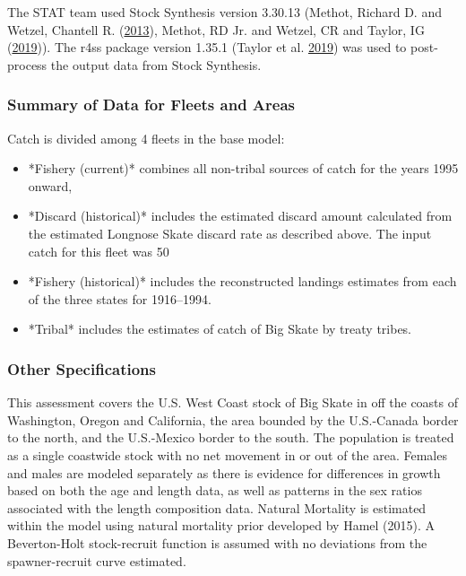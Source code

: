 \documentclass[12pt,]{article}
\begin{document}
The STAT team used Stock Synthesis version 3.30.13 (Methot, Richard D.
and Wetzel, Chantell R. (\protect\hyperlink{ref-Methot2013}{2013}),
Methot, RD Jr. and Wetzel, CR and Taylor, IG
(\protect\hyperlink{ref-Methot2019}{2019})). The r4ss package version
1.35.1 (Taylor et al. \protect\hyperlink{ref-Taylor2019}{2019}) was used
to post-process the output data from Stock Synthesis.

\hypertarget{summary-of-data-for-fleets-and-areas}{%
\subsubsection{Summary of Data for Fleets and
Areas}\label{summary-of-data-for-fleets-and-areas}}

Catch is divided among 4 fleets in the base model:

\begin{itemize}
\item *Fishery (current)* combines all non-tribal sources of catch for the years 1995 onward,
\item *Discard (historical)* includes the estimated discard amount calculated from the estimated Longnose Skate discard rate as described above. The input catch for this fleet was 50%
\item *Fishery (historical)* includes the reconstructed landings estimates from each of the three states for 1916--1994.
\item*Tribal* includes the estimates of catch of Big Skate by treaty tribes.
\end{itemize}

\hypertarget{other-specifications}{%
\subsubsection{Other Specifications}\label{other-specifications}}

This assessment covers the U.S. West Coast stock of Big Skate in off the
coasts of Washington, Oregon and California, the area bounded by the
U.S.-Canada border to the north, and the U.S.-Mexico border to the
south. The population is treated as a single coastwide stock with no net
movement in or out of the area. Females and males are modeled separately
as there is evidence for differences in growth based on both the age and
length data, as well as patterns in the sex ratios associated with the
length composition data. Natural Mortality is estimated within the model
using natural mortality prior developed by Hamel (2015). A Beverton-Holt
stock-recruit function is assumed with no deviations from the
spawner-recruit curve estimated.
\end{document}
